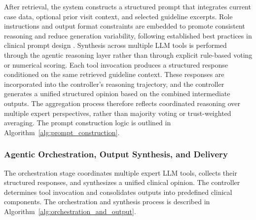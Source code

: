 \documentclass[preprint,12pt]{elsarticle}
\begin{document}
After retrieval, the system constructs a structured prompt that integrates current case data, optional prior visit context, and selected guideline excerpts. Role instructions and output format constraints are embedded to promote consistent reasoning and reduce generation variability, following established best practices in clinical prompt design \cite{r38,r37}. Synthesis across multiple LLM tools is performed through the agentic reasoning layer rather than through explicit rule-based voting or numerical scoring. Each tool invocation produces a structured response conditioned on the same retrieved guideline context. These responses are incorporated into the controller's reasoning trajectory, and the controller generates a unified structured opinion based on the combined intermediate outputs. The aggregation process therefore reflects coordinated reasoning over multiple expert perspectives, rather than majority voting or trust-weighted averaging. The prompt construction logic is outlined in Algorithm~\ref{alg:prompt_construction}.



\subsubsection[]{Agentic Orchestration, Output Synthesis, and Delivery}

The orchestration stage coordinates multiple expert LLM tools, collects their structured responses, and synthesizes a unified clinical opinion. The controller determines tool invocation and consolidates outputs into predefined clinical components. The orchestration and synthesis process is described in Algorithm~\ref{alg:orchestration_and_output}.


\begin{algorithm}[!ht]
\caption{Agentic Orchestration, Structured Output Generation, and Delivery}
\label{alg:orchestration_and_output}
\SetAlgoLined
{}
\end{algorithm}
\end{document}
